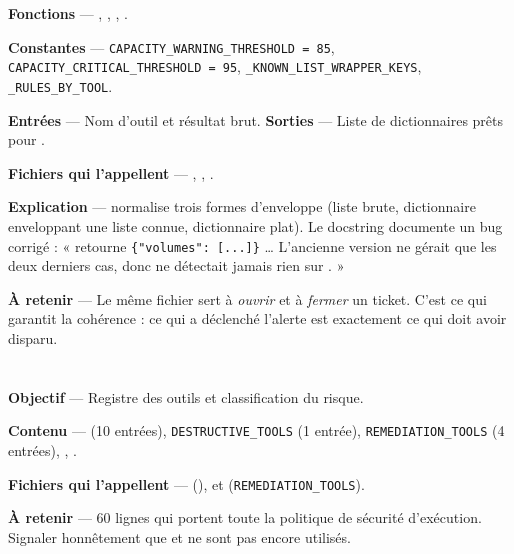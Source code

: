 \textbf{Fonctions} --- , ,
, .

\textbf{Constantes} --- \texttt{CAPACITY\_WARNING\_THRESHOLD = 85},
\texttt{CAPACITY\_CRITICAL\_THRESHOLD = 95},
\texttt{\_KNOWN\_LIST\_WRAPPER\_KEYS}, \texttt{\_RULES\_BY\_TOOL}.

\textbf{Entrées} --- Nom d'outil et résultat brut.
\textbf{Sorties} --- Liste de dictionnaires prêts pour
.

\textbf{Fichiers qui l'appellent} --- ,
, .

\textbf{Explication} ---  normalise trois formes
d'enveloppe (liste brute, dictionnaire enveloppant une liste connue,
dictionnaire plat). Le docstring documente un bug corrigé :
«  retourne \texttt{\{"volumes": [...]\}} \ldots{}
L'ancienne version ne gérait que les deux derniers cas, donc ne détectait jamais
rien sur . »

\textbf{À retenir} --- Le même fichier sert à \emph{ouvrir} et à \emph{fermer}
un ticket. C'est ce qui garantit la cohérence : ce qui a déclenché l'alerte est
exactement ce qui doit avoir disparu.

\section{}

\textbf{Objectif} --- Registre des outils et classification du risque.

\textbf{Contenu} ---  (10 entrées),
\texttt{DESTRUCTIVE\_TOOLS} (1 entrée), \texttt{REMEDIATION\_TOOLS} (4 entrées),
, .

\textbf{Fichiers qui l'appellent} --- 
(),  et 
(\texttt{REMEDIATION\_TOOLS}).

\textbf{À retenir} --- 60 lignes qui portent toute la politique de sécurité
d'exécution. Signaler honnêtement que  et  ne sont pas
encore utilisés.

\section{}

